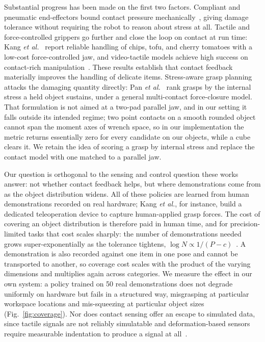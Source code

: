 Substantial progress has been made on the first two factors. Compliant and pneumatic
end-effectors bound contact pressure mechanically~\cite{wang2024softgripper}, giving damage
tolerance without requiring the robot to reason about stress at all. Tactile and
force-controlled grippers go further and close the loop on contact at run time: Kang
\emph{et al.}~\cite{kang2026learning} report reliable handling of chips, tofu, and cherry
tomatoes with a low-cost force-controlled jaw, and video-tactile models achieve high success
on contact-rich manipulation~\cite{vtam}. These results establish that contact feedback
materially improves the handling of delicate items. Stress-aware grasp planning attacks the
damaging quantity directly: Pan \emph{et al.}~\cite{pan2020stressmin} rank grasps by the
internal stress a held object sustains, under a general multi-contact force-closure model.
That formulation is not aimed at a two-pad parallel jaw, and in our setting it falls outside
its intended regime; two point contacts on a smooth rounded object cannot span the moment axes
of wrench space, so in our implementation the metric returns essentially zero for every
candidate on our objects, while a cube clears it. We retain the idea of scoring a grasp by
internal stress and replace the contact model with one matched to a parallel jaw.

Our question is orthogonal to the sensing and control question these works answer: not whether
contact feedback helps, but where demonstrations come from as the object distribution widens.
All of these policies are learned from human demonstrations recorded on real hardware; Kang
\emph{et al.}, for instance, build a dedicated teleoperation device to capture human-applied
grasp forces. The cost of covering an object distribution is therefore paid in human time, and
for precision-limited tasks that cost scales sharply: the number of demonstrations needed grows
super-exponentially as the tolerance tightens, $\log N \propto 1/(P-c)$~\cite{curseofprecision}.
A demonstration is also recorded against one item in one pose and cannot be transported to
another, so coverage cost scales with the product of the varying dimensions and multiplies again
across categories. We measure the effect in our own system: a policy trained on 50 real
demonstrations does not degrade uniformly on hardware but fails in a structured way, misgrasping
at particular workspace locations and mis-squeezing at particular object sizes
(Fig.~\ref{fig:coverage}). Nor does contact sensing offer an escape to simulated data, since
tactile signals are not reliably simulatable and deformation-based sensors require measurable
indentation to produce a signal at all~\cite{lighttact}.

